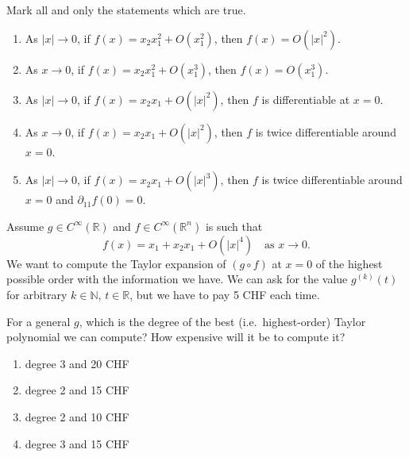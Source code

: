 

\begin{exercise}
\label{ex:landau_notation_multiple_choice}
Mark all and only the statements which are true.
\begin{enumerate}[label=\textbf{(\alph*)}]
  \item As $|x| \to 0$, if $f(x) = x_2x_1^2 + O(x_1^2)$, then $f(x) = O(|x|^2)$.
  \item As $x \to 0$, if $f(x) = x_2x_1^2 + O(x_1^3)$, then $f(x) = O(x_1^3)$.
  \item As $|x| \to 0$, if $f(x) = x_2x_1 + O(|x|^2)$, then $f$ is differentiable at $x = 0$.
  \item As $x \to 0$, if $f(x) = x_2x_1 + O(|x|^2)$, then $f$ is twice differentiable around
    $x = 0$.
  \item As $|x| \to 0$, if $f(x) = x_2x_1 + O(|x|^3)$, then $f$ is twice differentiable around
    $x = 0$ and $\partial_{11}f(0) = 0$.
\end{enumerate}
\end{exercise}


\begin{exercise}
\label{ex:taylor_expansion_cost_multiple_choice}
Assume $g \in C^\infty(\mathbb{R})$ and $f \in C^\infty(\mathbb{R}^n)$ is such that
$$f(x) = x_1 + x_2x_1 + O(|x|^4) \quad \text{as } x \to 0.$$
We want to compute the Taylor expansion of $(g\circ f)$ at $x = 0$ of the highest possible order
with the information we have. We can ask for the value $g^{(k)}(t)$ for arbitrary
$k \in \mathbb{N}$, $t \in \mathbb{R}$, but we have to pay 5 CHF each time.

For a general $g$, which is the degree of the best (i.e.\ highest-order) Taylor polynomial we can
compute? How expensive will it be to compute it?
\begin{enumerate}[label=\textbf{(\alph*)}]
  \item degree 3 and 20 CHF
  \item degree 2 and 15 CHF
  \item degree 2 and 10 CHF
  \item degree 3 and 15 CHF
\end{enumerate}
\end{exercise}

